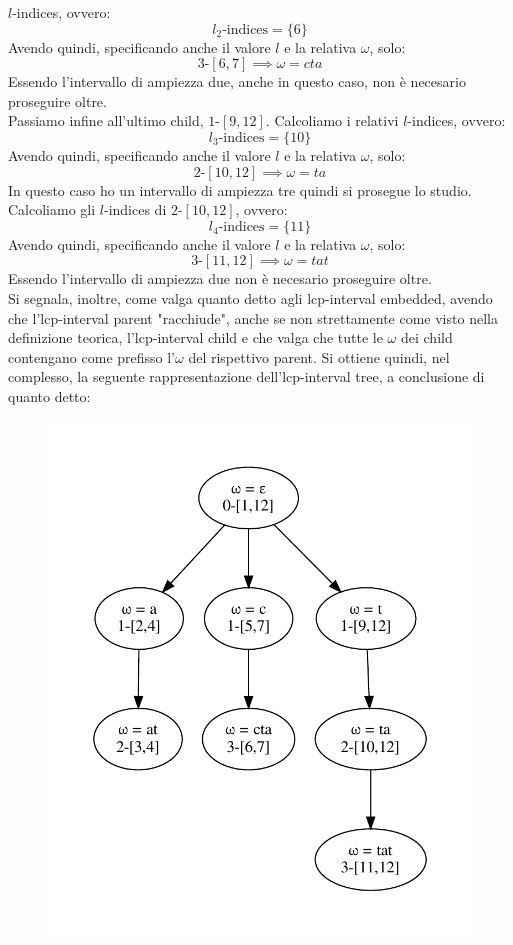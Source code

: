 \documentclass[a4paper,12pt, oneside]{book}
\begin{document}
\begin{esempio}
  $l$-indices, ovvero: 
  \[l_2\mbox{-indices}=\{6\}\]
  Avendo quindi, specificando
  anche il valore $l$ e la relativa $\omega$, solo:
  \[3\mbox{-}[6,7]\implies \omega=cta\]
  Essendo l'intervallo di ampiezza due, anche in questo caso, non è necesario
  proseguire oltre.\\
  Passiamo infine all'ultimo child, $1\mbox{-}[9,12]$. Calcoliamo i relativi
  $l$-indices, ovvero: 
  \[l_3\mbox{-indices}=\{10\}\]
  Avendo quindi, specificando
  anche il valore $l$ e la relativa $\omega$, solo:
  \[2\mbox{-}[10,12]\implies \omega=ta\]
  In questo caso ho un intervallo di ampiezza tre quindi si prosegue lo studio.
  Calcoliamo gli $l$-indices di $2\mbox{-}[10,12]$, ovvero: 
  \[l_4\mbox{-indices}=\{11\}\]
  Avendo quindi, specificando
  anche il valore $l$ e la relativa $\omega$, solo:
  \[3\mbox{-}[11,12]\implies \omega=tat\]
  Essendo l'intervallo di ampiezza due non è necesario proseguire oltre.\\
  Si segnala, inoltre, come valga quanto detto agli
  lcp-interval embedded, avendo che l'lcp-interval parent "racchiude", anche se
  non strettamente come visto nella definizione teorica, l'lcp-interval child e
  che valga che tutte le $\omega$ dei child contengano come prefisso l'$\omega$
  del rispettivo parent. 
  \newpage
  Si ottiene quindi, nel complesso, la seguente rappresentazione
  dell'lcp-interval tree, a conclusione di quanto detto:
  \begin{figure}[H]
    \centering
    \includegraphics[scale = 0.7]{img/ass3lcp.pdf}

\end{figure}
\end{esempio}
\end{document}
